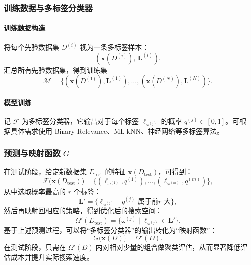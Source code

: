\documentclass[8pt,twocolumn]{article} %
\numberwithin{equation}{section}
\begin{document}
\subsubsection{训练数据与多标签分类器}
\paragraph{训练数据构造}
将每个先验数据集 \(D^{(i)}\) 视为一条多标签样本：
\[
(\mathbf{x}(D^{(i)}),\, \mathbf{L}^{(i)}).
\]
汇总所有先验数据集，得到训练集
\begin{equation}\label{eq:training set}
\mathcal{M}
= \{(\mathbf{x}(D^{(1)}), \mathbf{L}^{(1)}), \dots, (\mathbf{x}(D^{(N)}), \mathbf{L}^{(N)})\}.
\end{equation}
\paragraph{模型训练}
记 \(\mathcal{F}\) 为多标签分类器，它输出对于每个标签 \(\ell_{\omega^{(j)}}\) 的概率 \(q^{(j)} \in [0,1]\)。可根据具体需求使用 Binary Relevance、ML-kNN、神经网络等多标签算法。

\subsubsection{预测与映射函数 \(G\)}
在测试阶段，给定新数据集 \(D_{\text{test}}\) 的特征 \(\mathbf{x}(D_{\text{test}})\)，可得到：
\begin{equation}\label{eq:classifier}
\mathcal{F}\bigl(\mathbf{x}(D_{\text{test}})\bigr)
= \{(\ell_{\omega^{(1)}}, q^{(1)}), \dots, (\ell_{\omega^{(m)}}, q^{(m)})\},
\end{equation}
从中选取概率最高的 \(r\) 个标签：
\begin{equation}\label{eq:predicted label space for test}
\mathbf{L}' 
= \{\ell_{\omega^{(j)}} \mid q^{(j)} \text{ 属于前}r\text{ 大}\},
\end{equation}
然后再映射回相应的策略，得到优化后的搜索空间：
\begin{equation}\label{eq:optimized space}
\Omega'(D_{\text{test}})
= \{\omega^{(j)} \mid \ell_{\omega^{(j)}} \in \mathbf{L}'\}.
\end{equation}
基于上述预测过程，可以将“多标签分类器”的输出转化为“映射函数”：
\begin{equation}
G\bigl(\mathbf{x}(D)\bigr)
= \Omega'(D).
\end{equation}
在测试阶段，只需在 $\Omega'(D)$ 内对相对少量的组合做聚类评估，从而显著降低评估成本并提升实际搜索速度。
\end{document}
